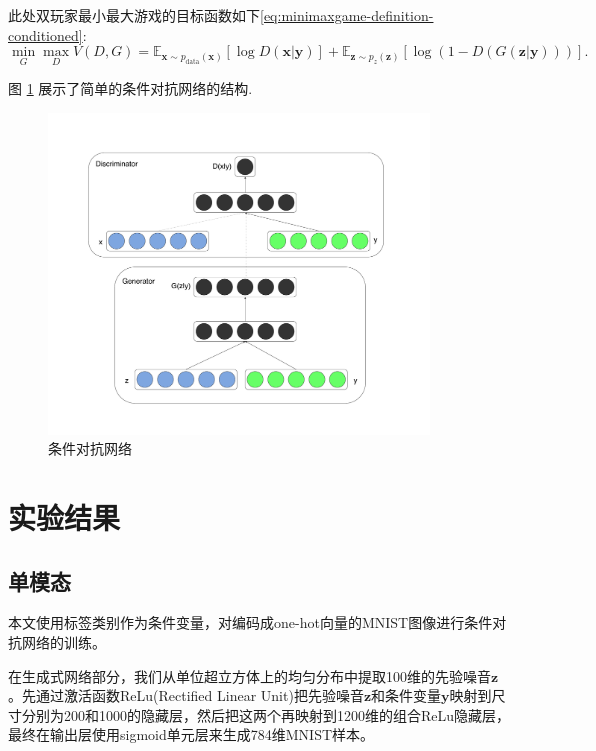 \documentclass{article} %
\begin{document}
此处双玩家最小最大游戏的目标函数如下\ref{eq:minimaxgame-definition-conditioned}:
\begin{equation}
\label{eq:minimaxgame-definition-conditioned}
\min_G \max_D V(D, G) = \mathbb{E}_{\bm{x} \sim p_{\text{data}}(\bm{x})}[\log D(\bm{x} | \bm{y})] + \mathbb{E}_{\bm{z} \sim p_z(\bm{z})}[\log (1 - D(G(\bm{z} | \bm{y})))].
\end{equation}

图 \ref{fig:diagram} 展示了简单的条件对抗网络的结构.

\begin{figure}[h]
\centering
    \includegraphics[width=0.9\textwidth]{diagram.pdf}
    \caption{\small 条件对抗网络}
\label{fig:diagram}
\end{figure}


\section{实验结果}
\subsection{单模态}

本文使用标签类别作为条件变量，对编码成one-hot向量的MNIST图像进行条件对抗网络的训练。

在生成式网络部分，我们从单位超立方体上的均匀分布中提取100维的先验噪音${\bm{z}}$。先通过激活函数ReLu(Rectified Linear Unit)\cite{glorot2011deep, Jarrett-ICCV2009-small}把先验噪音${\bm{z}}$和条件变量${\bm{y}}$映射到尺寸分别为200和1000的隐藏层，然后把这两个再映射到1200维的组合ReLu隐藏层，最终在输出层使用sigmoid单元层来生成784维MNIST样本。
\end{document}
